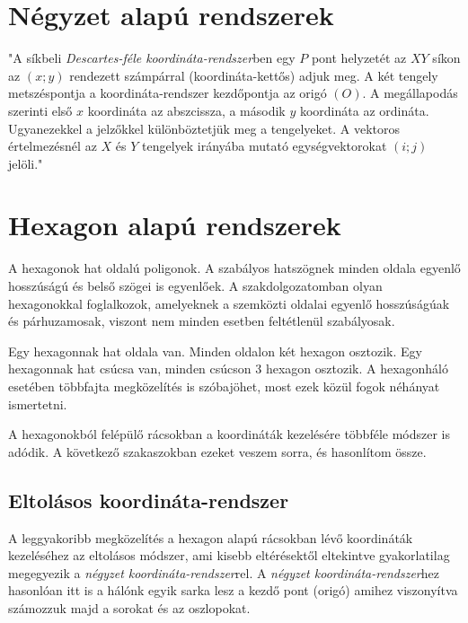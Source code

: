 
\section{Négyzet alapú rendszerek}
\cite{WikiSquare}

"A síkbeli \textit{Descartes-féle koordináta-rendszer}ben egy $P$ pont helyzetét az $XY$ síkon az $(x;y)$ rendezett számpárral (koordináta-kettős) adjuk meg. A két tengely metszéspontja a koordináta-rendszer kezdőpontja az origó $(O)$. A megállapodás szerinti első $x$ koordináta az abszcissza, a második $y$ koordináta az ordináta. Ugyanezekkel a jelzőkkel különböztetjük meg a tengelyeket. A vektoros értelmezésnél az $X$ és $Y$ tengelyek irányába mutató egységvektorokat $(i;j)$ jelöli."

\section{Hexagon alapú rendszerek}
\label{sec:hexagon}
\cite{redblobgamesHexagonalGrids}

A hexagonok hat oldalú poligonok. A szabályos hatszögnek minden oldala egyenlő hosszúságú és belső szögei is egyenlőek. A szakdolgozatomban olyan hexagonokkal foglalkozok, amelyeknek a szemközti oldalai egyenlő hosszúságúak és párhuzamosak, viszont nem minden esetben feltétlenül szabályosak.

Egy hexagonnak hat oldala van. Minden oldalon két hexagon osztozik. Egy hexagonnak hat csúcsa van, minden csúcson 3 hexagon osztozik. A hexagonháló esetében többfajta megközelítés is szóbajöhet, most ezek közül fogok néhányat ismertetni.

A hexagonokból felépülő rácsokban a koordináták kezelésére többféle módszer is adódik. A következő szakaszokban ezeket veszem sorra, és hasonlítom össze.

\subsection{Eltolásos koordináta-rendszer}
\cite{redblobgamesHexagonalGrids}

A leggyakoribb megközelítés a hexagon alapú rácsokban lévő koordináták kezeléséhez az eltolásos módszer, ami kisebb eltérésektől eltekintve gyakorlatilag megegyezik a \textit{négyzet koordináta-rendszer}rel. A \textit{négyzet koordináta-rendszer}hez hasonlóan itt is a hálónk egyik sarka lesz a kezdő pont (origó) amihez viszonyítva számozzuk majd a sorokat és az oszlopokat.

